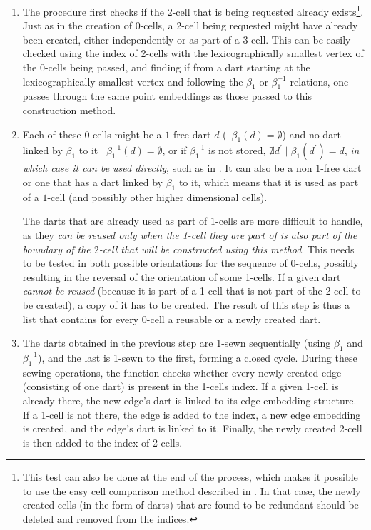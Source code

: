 \begin{enumerate}

\item
The procedure first checks if the 2-cell that is being requested already exists\footnote{This test can also be done at the end of the process, which makes it possible to use the easy cell comparison method described in .
In that case, the newly created cells (in the form of darts) that are found to be redundant should be deleted and removed from the indices.}.
Just as in the creation of 0-cells, a 2-cell being requested might have already been created, either independently or as part of a 3-cell.
This can be easily checked using the index of 2-cells with the lexicographically smallest vertex of the 0-cells being passed, and finding if from a dart starting at the lexicographically smallest vertex and following the $\beta_1$ or $\beta_1^{-1}$ relations, one passes through the same point embeddings as those passed to this construction method.

\item
Each of these 0-cells might be a $1$-free dart $d$ (\ie\ $\beta_1(d) = \emptyset$) and no dart linked by $\beta_1$ to it \ie\ $\beta_1^{-1}(d) = \emptyset$, or if $\beta_1^{-1}$ is not stored, $\nexists d^\prime \mid \beta_1(d^\prime) = d$, \emph{in which case it can be used directly}, such as in .
It can also be a non $1$-free dart or one that has a dart linked by $\beta_1$ to it, which means that it is used as part of a $1$-cell (and possibly other higher dimensional cells).

The darts that are already used as part of $1$-cells are more difficult to handle, as they \emph{can be reused only when the 1-cell they are part of is also part of the boundary of the $2$-cell that will be constructed using this method}.
This needs to be tested in both possible orientations for the sequence of 0-cells, possibly resulting in the reversal of the orientation of some 1-cells.
If a given dart \emph{cannot be reused} (because it is part of a 1-cell that is not part of the 2-cell to be created), a copy of it has to be created.
The result of this step is thus a list that contains for every 0-cell a reusable or a newly created dart.

\item
The darts obtained in the previous step are 1-sewn sequentially (using $\beta_1$ and $\beta_1^{-1}$), and the last is 1-sewn to the first, forming a closed cycle.
During these sewing operations, the function checks whether every newly created edge (consisting of one dart) is present in the 1-cells index.
If a given 1-cell is already there, the new edge's dart is linked to its edge embedding structure.
If a 1-cell is not there, the edge is added to the index, a new edge embedding is created, and the edge's dart is linked to it.
Finally, the newly created 2-cell is then added to the index of 2-cells.


\end{enumerate}
